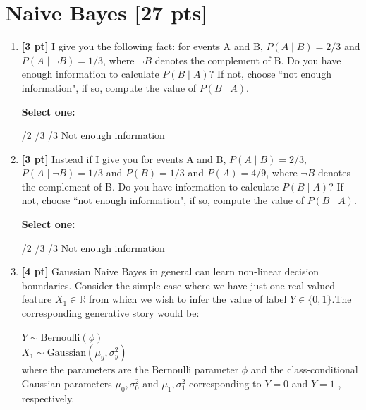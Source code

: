 \documentclass[12pt,addpoints,answers]{exam}
\begin{document}
\section{Naive Bayes [27 pts]}
\begin{enumerate}
    \item \textbf{[3 pt]} I give you the following fact: for events A and B, $P(A\mid B) = 2/3$ and $P(A\mid \neg B) = 1/3$, where $\neg B$ denotes the complement of B. Do you have enough information to calculate $P(B\mid A)$? If not, choose ``not enough information", if so, compute the value of $P(B\mid A)$.

    \textbf{Select one:}
    \begin{checkboxes}
        /2
        /3
        /3
        \choice Not enough information
    \end{checkboxes}
    
    
    \item \textbf{[3 pt]} Instead if I give you for events A and B, $P(A\mid B) = 2/3$, $P(A\mid \neg B) = 1/3$ and $P(B) = 1/3$ and $P(A) = 4/9$, where $\neg B$ denotes the complement of B. Do you have information to calculate $P(B\mid A)$? If not, choose ``not enough information", if so, compute the value of $P(B\mid A)$.

    \textbf{Select one:}
    \begin{checkboxes}
        /2
        /3
        /3
        \choice Not enough information
    \end{checkboxes}
    
    
    \clearpage
    

    
    \clearpage
    
    \item \textbf{[4 pt]} Gaussian Naive Bayes in general can learn non-linear decision boundaries. Consider the simple case where we have just one real-valued feature $X_1\in\mathbb{R}$ from which we wish to infer the value of label $Y\in\{0,1\}$.The corresponding generative story would be:
    
    $Y \sim \text{Bernoulli}(\phi)$\\
    $X_1 \sim \text{Gaussian}(\mu_y, \sigma^2_y)$\\
    where the parameters are the Bernoulli parameter $\phi$  and the class-conditional Gaussian parameters $\mu_0, \sigma^2_0$ and $\mu_1, \sigma^2_1$   corresponding to $Y=0$ and $Y=1$ , respectively.


\end{enumerate}
\end{document}
